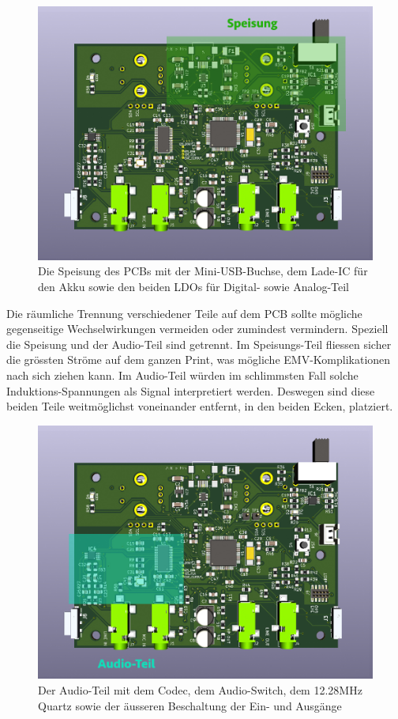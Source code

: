 \begin{figure} [H]
\begin{center}
 \includegraphics[scale=0.35]{../graphics/PCB-Layout_PWR.jpg}
 \caption{Die Speisung des PCBs mit der Mini-USB-Buchse, dem Lade-IC für den Akku sowie den beiden LDOs für Digital- sowie Analog-Teil}
\label{fig:PCB_PWR}
\end{center}
\end{figure}
Die räumliche Trennung verschiedener Teile auf dem PCB sollte mögliche gegenseitige Wechselwirkungen vermeiden oder zumindest vermindern. Speziell die Speisung und der Audio-Teil sind getrennt. Im Speisungs-Teil fliessen sicher die grössten Ströme auf dem ganzen Print, was mögliche EMV-Komplikationen nach sich ziehen kann. Im Audio-Teil würden im schlimmsten Fall solche Induktions-Spannungen als Signal interpretiert werden. Deswegen sind diese beiden Teile weitmöglichst voneinander entfernt, in den beiden Ecken, platziert.

\begin{figure} [H]
\begin{center}
 \includegraphics[scale=0.35]{../graphics/PCB-Layout_AUDIO.jpg}
 \caption{Der Audio-Teil mit dem Codec, dem Audio-Switch, dem 12.28MHz Quartz sowie der äusseren Beschaltung der Ein- und Ausgänge}
\label{fig:PCB_AUDIO}
\end{center}
\end{figure}

